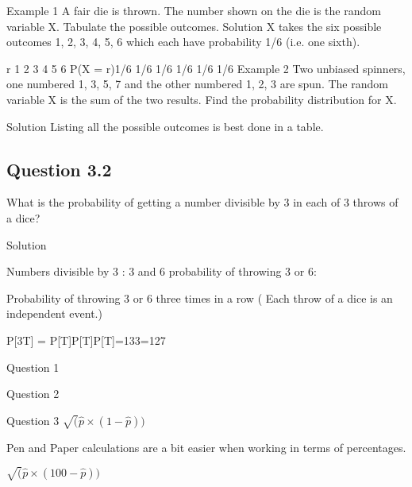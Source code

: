 \documentclass[]{report}
\begin{document}
{{%
Example 1
A fair die is thrown. The number shown on the die is the random variable X. Tabulate the possible outcomes.
Solution
X takes the six possible outcomes 1, 2, 3, 4, 5, 6 which each have probability 1/6 (i.e. one sixth).

r 1 2 3 4 5 6
P(X = r)1/6 1/6 1/6 1/6 1/6 1/6
Example 2
Two unbiased spinners, one numbered 1, 3, 5, 7 and the other numbered 1, 2, 3 are spun. The random variable X is the sum of the two results.
Find the probability distribution for X.



Solution
Listing all the possible outcomes is best done in a table.







\subsection{Question 3.2 }


What is the probability of getting a number divisible by 3 in each of 3 throws of a dice?




Solution



Numbers divisible by 3 : 3 and 6            probability of throwing 3 or 6:   



Probability of throwing 3 or 6 three times in a row  ( Each throw of a dice is an independent event.)



P[3T] = P[T]P[T]P[T]=133=127







Question 1


Question 2

Question 3
$\sqrt(\hat{p} \times (1-\hat{p} ))$

Pen and Paper calculations are a bit easier when working in terms of percentages.

$\sqrt(\hat{p} \times (100-\hat{p} ))$

}}
\end{document}
